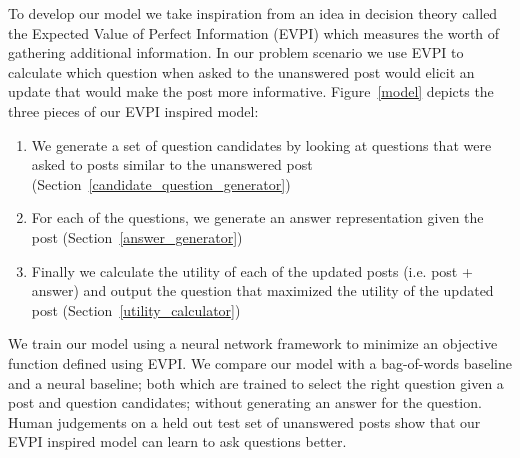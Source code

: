 \documentclass[11pt]{article}
\begin{document}
To develop our model we take inspiration from an idea in decision theory called the Expected Value of Perfect Information (EVPI) which measures the worth of gathering additional information.  In our problem scenario we use EVPI to calculate which question when asked to the unanswered post would elicit an update that would make the post more informative. Figure~\ref{model} depicts the three pieces of our EVPI inspired model: 
\begin{enumerate}
\item We generate a set of question candidates by looking at questions that were asked to posts similar to the unanswered post (Section~\ref{candidate_question_generator})
\item For each of the questions, we generate an answer representation given the post (Section~\ref{answer_generator})
\item Finally we calculate the utility of each of the updated posts (i.e. post + answer) and output the question that maximized the utility of the updated post (Section~\ref{utility_calculator})
\end{enumerate}

We train our model using a neural network framework to minimize an objective function defined using EVPI. We compare our model with a bag-of-words baseline and a neural baseline; both which are trained to select the right question given a post and question candidates; without generating an answer for the question. Human judgements on a held out test set of unanswered posts show that our EVPI inspired model can learn to ask questions better.

\end{document}
